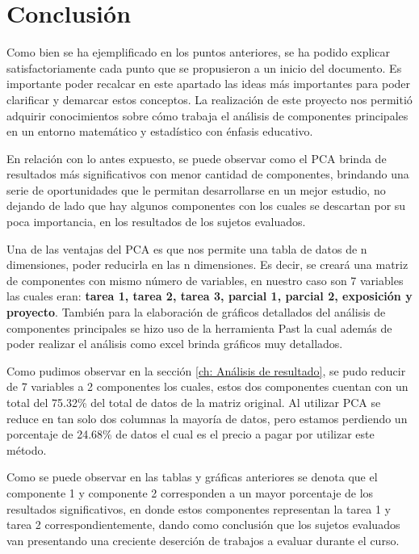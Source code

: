 \chapter{Conclusión}
\label{ch: Conclusión}


Como bien se ha ejemplificado en los puntos anteriores, se ha podido explicar
satisfactoriamente cada punto que se propusieron a un inicio del documento. Es
importante poder recalcar en este apartado las ideas más importantes para poder
clarificar y demarcar estos conceptos. La realización de este proyecto nos permitió
adquirir conocimientos sobre cómo trabaja el análisis de componentes principales en un entorno matemático y estadístico con énfasis educativo.

En relación con lo antes expuesto, se puede observar como el PCA brinda de resultados más significativos con menor cantidad de componentes, brindando una  serie de oportunidades que le permitan desarrollarse en un mejor estudio, no dejando de lado que hay algunos componentes con los cuales se descartan por su poca importancia, en los resultados de los sujetos evaluados.

Una de las ventajas del PCA es que nos permite una tabla de datos de n dimensiones, poder reducirla en las n dimensiones. Es decir, se creará una matriz de componentes con mismo número de variables, en nuestro caso son 7 variables las cuales eran: \textbf{tarea 1, tarea 2, tarea 3, parcial 1, parcial 2, exposición y proyecto}. También para la elaboración de gráficos detallados del análisis de componentes principales se hizo uso de la herramienta Past la cual además de poder realizar el análisis como excel brinda gráficos muy detallados.

Como pudimos observar en la sección \ref{ch: Análisis de resultado}, se pudo reducir de 7 variables a 2 componentes los cuales, estos dos componentes cuentan con un total del 75.32\% del total de datos de la matriz original. Al utilizar PCA se reduce en tan solo dos columnas la mayoría de datos, pero estamos perdiendo un porcentaje de 24.68\% de datos el cual es el precio a pagar por utilizar este método.

Como se puede observar en las tablas y gráficas anteriores se denota que el componente 1 y componente 2 corresponden a un mayor porcentaje de los resultados significativos, en donde estos componentes representan la tarea 1 y tarea 2 correspondientemente, dando como conclusión que los sujetos evaluados van presentando una creciente deserción  de trabajos a evaluar durante el curso.    